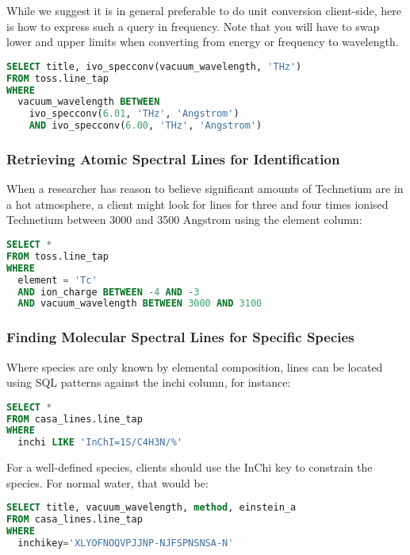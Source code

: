 \documentclass[11pt,a4paper]{ivoa}
\begin{document}
While we suggest it is in general preferable to do unit conversion
client-side, here is how to express such a query in
frequency.
Note that you will have to swap lower and upper limits when converting
from energy or frequency to wavelength.

\begin{lstlisting}[language=SQL]
SELECT title, ivo_specconv(vacuum_wavelength, 'THz')
FROM toss.line_tap
WHERE
  vacuum_wavelength BETWEEN 
    ivo_specconv(6.01, 'THz', 'Angstrom')
    AND ivo_specconv(6.00, 'THz', 'Angstrom')
\end{lstlisting}


\subsubsection{Retrieving Atomic Spectral Lines for Identification}

When a researcher has reason to believe significant amounts of
Technetium are in a hot atmosphere, a client might look for lines for
three and four times ionised Technetium between 3000 and
3500 Angstrom using the element column:

\begin{lstlisting}[language=SQL]
SELECT *
FROM toss.line_tap
WHERE
  element = 'Tc'
  AND ion_charge BETWEEN -4 AND -3
  AND vacuum_wavelength BETWEEN 3000 AND 3100
\end{lstlisting}


\subsubsection{Finding Molecular Spectral Lines for Specific Species}

Where species are only known by elemental composition, lines can be
located using SQL patterns against the inchi column, for instance:

\begin{lstlisting}[language=SQL]
SELECT *
FROM casa_lines.line_tap
WHERE
  inchi LIKE 'InChI=1S/C4H3N/%'
\end{lstlisting}

For a well-defined species, clients should use the InChi key to
constrain the species.  For
normal water, that would be:

\begin{lstlisting}[language=SQL]
SELECT title, vacuum_wavelength, method, einstein_a
FROM casa_lines.line_tap
WHERE
  inchikey='XLYOFNOQVPJJNP-NJFSPNSNSA-N'
\end{lstlisting}
\end{document}

